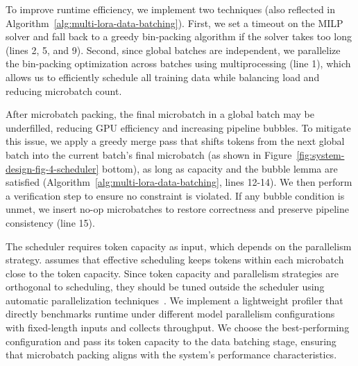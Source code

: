 To improve runtime efficiency, we implement two techniques (also reflected in Algorithm~\ref{alg:multi-lora-data-batching}). First, we set a timeout on the MILP solver and fall back to a greedy bin-packing algorithm if the solver takes too long (lines 2, 5, and 9). Second, since global batches are independent, we parallelize the bin-packing optimization across batches using multiprocessing (line 1), which allows us to efficiently schedule all training data while balancing load and reducing microbatch count.

After microbatch packing, the final microbatch in a global batch may be underfilled, reducing GPU efficiency and increasing pipeline bubbles. To mitigate this issue, we apply a greedy merge pass that shifts tokens from the next global batch into the current batch's final microbatch (as shown in Figure~\ref{fig:system-design-fig-4-scheduler} bottom), as long as capacity and the bubble lemma are satisfied (Algorithm~\ref{alg:multi-lora-data-batching}, lines 12-14). We then perform a verification step to ensure no constraint is violated. If any bubble condition is unmet, we insert no-op microbatches to restore correctness and preserve pipeline consistency (line 15).

The scheduler requires token capacity as input, which depends on the parallelism strategy.
\Name assumes that effective scheduling keeps tokens within each microbatch close to the token capacity.
Since token capacity and parallelism strategies are orthogonal to scheduling, they should be tuned outside the scheduler using automatic parallelization techniques~\cite{zheng2022alpa,flexflow,liu2024aceso,zhu2025mist}.
We implement a lightweight profiler that directly benchmarks runtime under different model parallelism configurations with fixed-length inputs and collects throughput. 
We choose the best-performing configuration and pass its token capacity to the data batching stage, ensuring that microbatch packing aligns with the system's performance characteristics.

    